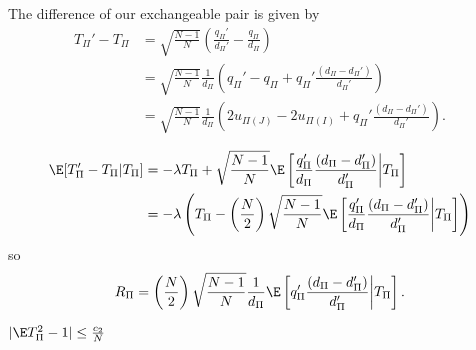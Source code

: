 The difference of our exchangeable pair is given by
\begin{align}
  T_{\Pi}' - T_{\Pi}
  &= \sqrt{\frac{N-1}{N}}\left (\frac{q_{\Pi}'}{d_{\Pi}'}-\frac{q_{\Pi}}{d_{\Pi}}\right )
  \nonumber \\
  &= \sqrt{\frac{N-1}{N}}\frac{1}{d_{\Pi}}\left (q_{\Pi}' - q_{\Pi} +
    q_{\Pi}' \frac{(d_{\Pi}-d_{\Pi}')}{d_{\Pi}'}\right ) \nonumber \\
  &= \sqrt{\frac{N-1}{N}}\frac{1}{d_{\Pi}}\left
    (2u_{\Pi(J)} - 2u_{\Pi(I)} + q_{\Pi}' \frac{(d_{\Pi}-d_{\Pi}')}{d_{\Pi}'}\right ). \label{def:ttpcubed}
\end{align}

\begin{align*}
  \E[T_{\Pi}'-T_{\Pi}|T_{\Pi}] 
  &= - \lambda T_{\Pi} + \sqrt{\frac{N-1}{N}}
  \E\left [\frac{q_{\Pi}'}{d_{\Pi}} \frac{(d_{\Pi}-d_{\Pi}')}{d_{\Pi}'}\middle |T_{\Pi} \right ] \\
  &= - \lambda \left ( T_{\Pi} - \left ( \frac{N}{2} \right ) 
    \sqrt{\frac{N-1}{N}}
    \E\left [\frac{q_{\Pi}'}{d_{\Pi}} \frac{(d_{\Pi}-d_{\Pi}')}{d_{\Pi}'}\middle |T_{\Pi} \right ] \right ) 
\end{align*}
so 
\begin{equation}
  \label{def:Rdef}
  R_{\Pi} = \left (\frac{N}{2}\right )\sqrt{\frac{N-1}{N}}\frac{1}{d_{\Pi}}\E
  \left [q_{\Pi}'\frac{(d_{\Pi}-d_{\Pi}')}{d_{\Pi}'} \middle | T_{\Pi} \right ].
\end{equation}

\begin{proposition}
  $|\E T_{\Pi}^2 -1| \leq \frac{c_2}{N}$
\end{proposition}

